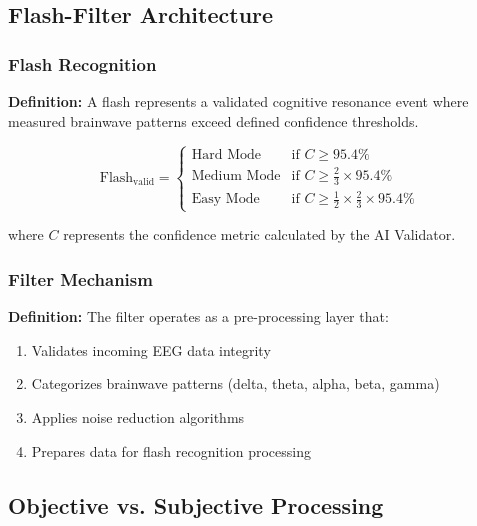 \documentclass[12pt,a4paper]{article}
\begin{document}
\subsection{Flash-Filter Architecture}

\subsubsection{Flash Recognition}
\textbf{Definition:} A \gls{flash} represents a validated cognitive resonance event where measured brainwave patterns exceed defined confidence thresholds.

\begin{equation}
\text{Flash}_{\text{valid}} = 
\begin{cases}
\text{Hard Mode} & \text{if } C \geq 95.4\% \\
\text{Medium Mode} & \text{if } C \geq \frac{2}{3} \times 95.4\% \\
\text{Easy Mode} & \text{if } C \geq \frac{1}{2} \times \frac{2}{3} \times 95.4\%
\end{cases}
\end{equation}

where $C$ represents the confidence metric calculated by the AI Validator.

\subsubsection{Filter Mechanism}
\textbf{Definition:} The \gls{filter} operates as a pre-processing layer that:
\begin{enumerate}
    \item Validates incoming EEG data integrity
    \item Categorizes brainwave patterns (delta, theta, alpha, beta, gamma)
    \item Applies noise reduction algorithms
    \item Prepares data for flash recognition processing
\end{enumerate}

\subsection{Objective vs. Subjective Processing}
\end{document}
